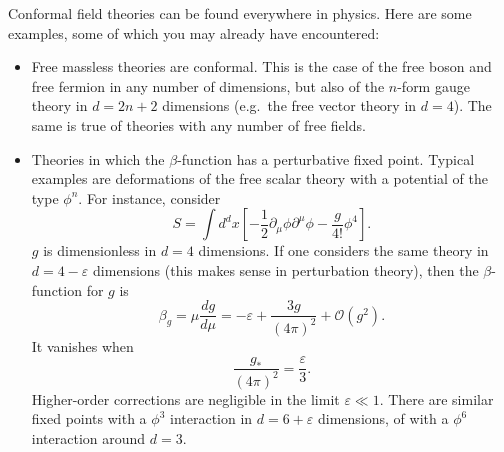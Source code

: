 \documentclass[a4paper,12pt]{article}
\renewcommand{\O}{\mathcal{O}}
\numberwithin{equation}{section}
\begin{document}
Conformal field theories can be found everywhere in physics. Here are some examples, some of which you may already have encountered:%
%
\begin{itemize}

\item
Free massless theories are conformal. This is the case of the free boson and free fermion in any number of dimensions, but also of the $n$-form gauge theory in $d = 2n + 2$ dimensions (e.g.~the free vector theory in $d = 4$). The same is true of theories with any number of free fields.

\item
Theories in which the $\beta$-function has a perturbative fixed point. Typical examples are deformations of the free scalar theory with a potential of the type $\phi^n$. For instance, consider
\begin{equation}
	S = \int d^dx \left[
	- \frac{1}{2} \partial_\mu \phi \partial^\mu \phi
	- \frac{g}{4!} \phi^4 \right].
\end{equation}
$g$ is dimensionless in $d = 4$ dimensions. If one considers the same theory in $d = 4 - \varepsilon$ dimensions (this makes sense in perturbation theory), then the $\beta$-function for $g$ is
\begin{equation}
	\beta_g = \mu \frac{dg}{d\mu}
	= - \varepsilon + \frac{3g}{(4\pi)^2}
	+ \O(g^2).
\end{equation}
It vanishes when
\begin{equation}
	\frac{g_*}{(4\pi)^2} = \frac{\varepsilon}{3}.
\end{equation}
Higher-order corrections are negligible in the limit $\varepsilon \ll 1$.
There are similar fixed points with a $\phi^3$ interaction in $d = 6 + \varepsilon$ dimensions, of with a $\phi^6$ interaction around $d = 3$.



\end{itemize}
\end{document}
